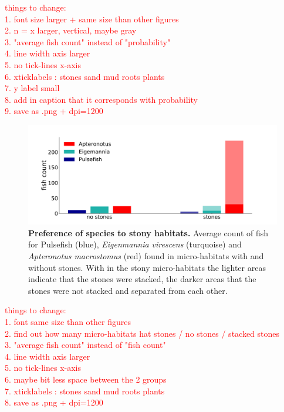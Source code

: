 \textcolor{red}{things to change:\\
    1. font size larger + same size than other figures\\
    2. n = x larger, vertical, maybe gray \\
    3. "average fish count" instead of "probability"\\
    4. line width axis larger\\
    5. no tick-lines x-axis\\
    6. xticklabels : stones sand mud roots plants\\
    7. y label small\\
    8. add in caption that it corresponds with probability\\
    9. save as .png + dpi=1200}

\begin{figure}[H]
    \centering
    \includegraphics[width = \textwidth]{pictures/Results/Stone_nostone_count.pdf}
    \caption{\textbf{Preference of species to stony habitats.} Average count of fish for Pulsefish (blue), \textit{Eigenmannia virescens} (turquoise) and \textit{Apteronotus macrostomus} (red) found in micro-habitats with and without stones. With in the stony micro-habitats the lighter areas indicate that the stones were stacked, the darker areas that the stones were not stacked and separated from each other.}
    \label{fig:habitat_count_stones}
\end{figure}

\textcolor{red}{things to change:\\
1. font same size than other figures\\
2. find out how many micro-habitats hat stones / no stones / stacked stones  \\
3. "average fish count" instead of "fish count"\\
4. line width axis larger\\
5. no tick-lines x-axis\\
6. maybe bit less space between the 2 groups\\
7. xticklabels : stones sand mud roots plants\\
8. save as .png + dpi=1200}\\

